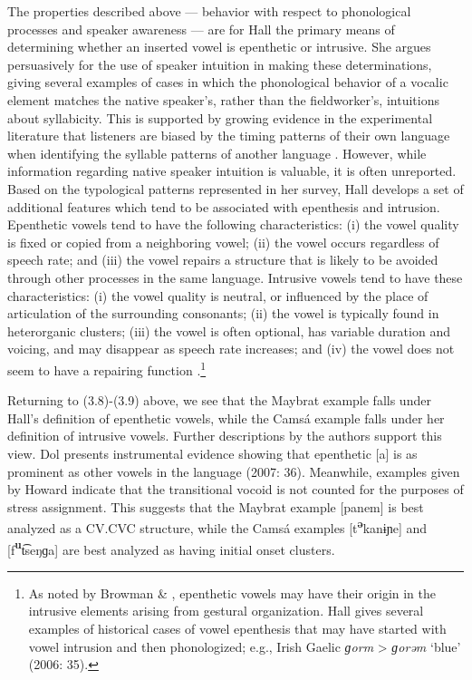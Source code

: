   The properties described above — behavior with respect to phonological processes and speaker awareness — are for Hall the primary means of determining whether an inserted vowel is epenthetic or intrusive. She argues persuasively for the use of speaker intuition in making these determinations, giving several examples of cases in which the phonological behavior of a vocalic element matches the native speaker’s, rather than the fieldworker’s, intuitions about syllabicity. This is supported by growing evidence in the experimental literature that listeners are biased by the timing patterns of their own language when identifying the syllable patterns of another language \citep{KwonEtAl2017}. However, while information regarding native speaker intuition is valuable, it is often unreported. Based on the typological patterns represented in her survey, Hall develops a set of additional features which tend to be associated with epenthesis and intrusion. Epenthetic vowels tend to have the following characteristics: (i) the vowel quality is fixed or copied from a neighboring vowel; (ii) the vowel occurs regardless of speech rate; and (iii) the vowel repairs a structure that is likely to be avoided through other processes in the same language. Intrusive vowels tend to have these characteristics: (i) the vowel quality is neutral, or influenced by the place of articulation of the surrounding consonants; (ii) the vowel is typically found in heterorganic clusters; (iii) the vowel is often optional, has variable duration and voicing, and may disappear as speech rate increases; and (iv) the vowel does not seem to have a repairing function \citep[391]{Hall2006}.\footnote{ \textrm{As noted by Browman \& \citet[53]{Goldstein1992a}, epenthetic vowels may have their origin in the intrusive elements arising from gestural organization. Hall gives several examples of historical cases of vowel epenthesis that may have started with vowel intrusion and then phonologized; e.g., Irish Gaelic} \textrm{\textit{ɡorm}} > \textrm{\textit{ɡorəm}} \textrm{‘blue’ (2006: 35).}}



  Returning to (3.8)-(3.9) above, we see that the Maybrat example falls under Hall’s definition of epenthetic vowels, while the Camsá example falls under her definition of intrusive vowels. Further descriptions by the authors support this view. Dol presents instrumental evidence showing that epenthetic [a] is as prominent as other vowels in the language (2007: 36). Meanwhile, examples given by Howard indicate that the transitional vocoid is not counted for the purposes of stress assignment. This suggests that the Maybrat example [panem] is best analyzed as a CV.CVC structure, while the Camsá examples [t\textbf{\textsuperscript{ə}}kanɨɲe] and [f\textbf{\textsuperscript{u}}t͡seŋɡa] are best analyzed as having initial onset clusters.



